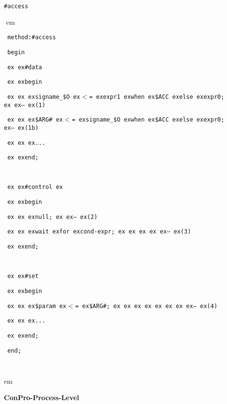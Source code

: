 \documentclass[a4paper,12pt,twoside,english]{article}
\def\s{\hskip 1.15 ex}
\begin{document}
\vskip5pt



\def\thesubsubsection{\vrule width 0pt height 1.3 ex}

\def\thesubsection{\tocXCVIII}
\secII{\label{toclabelXCVIII}\thesubsection}
\begin{description}
\item[] $ $\\
{\tt \#access}

\item[]
\def\prefskipu{}\def\prefskipo{}\def\prefskipa{}\def\prefskipu{\hskip10pt}\def\prefskipo{\hskip10pt}\def\prefskipa{\hskip20pt}\def\content{
\vskip-5pt{\parindent0pt\parbox{\linewidth}{\tt\smallsize\hskip10pt method:\#access}}
\vskip-5pt{\parindent0pt\parbox{\linewidth}{\tt\smallsize\hskip10pt begin}}
\vskip-5pt{\parindent0pt\parbox{\linewidth}{\tt\smallsize\hskip10pt \s \s \#data}}
\vskip-5pt{\parindent0pt\parbox{\linewidth}{\tt\smallsize\hskip10pt \s \s begin}}
\vskip-5pt{\parindent0pt\parbox{\linewidth}{\tt\smallsize\hskip10pt \s \s \s signame\_\$O\s $<$=\s expr1\s when\s \$ACC\s else\s expr0;\s \s --\s (1)}}
\vskip-5pt{\parindent0pt\parbox{\linewidth}{\tt\smallsize\hskip10pt \s \s \s \$ARG\#\s $<$=\s signame\_\$O\s when\s \$ACC\s else\s expr0;\s --\s (1b)}}
\vskip-5pt{\parindent0pt\parbox{\linewidth}{\tt\smallsize\hskip10pt \s \s \s ...}}
\vskip-5pt{\parindent0pt\parbox{\linewidth}{\tt\smallsize\hskip10pt \s \s end;}}
\vskip-5pt{\parindent0pt\parbox{\linewidth}{\tt\smallsize\hskip10pt }}
\vskip-5pt{\parindent0pt\parbox{\linewidth}{\tt\smallsize\hskip10pt \s \s \#control\s }}
\vskip-5pt{\parindent0pt\parbox{\linewidth}{\tt\smallsize\hskip10pt \s \s begin}}
\vskip-5pt{\parindent0pt\parbox{\linewidth}{\tt\smallsize\hskip10pt \s \s \s null;\s \s --\s (2)}}
\vskip-5pt{\parindent0pt\parbox{\linewidth}{\tt\smallsize\hskip10pt \s \s \s wait\s for\s cond-expr;\s \s \s \s \s --\s (3)}}
\vskip-5pt{\parindent0pt\parbox{\linewidth}{\tt\smallsize\hskip10pt \s \s end;}}
\vskip-5pt{\parindent0pt\parbox{\linewidth}{\tt\smallsize\hskip10pt }}
\vskip-5pt{\parindent0pt\parbox{\linewidth}{\tt\smallsize\hskip10pt \s \s \#set}}
\vskip-5pt{\parindent0pt\parbox{\linewidth}{\tt\smallsize\hskip10pt \s \s begin}}
\vskip-5pt{\parindent0pt\parbox{\linewidth}{\tt\smallsize\hskip10pt \s \s \s \$param\s $<$=\s \$ARG\#;\s \s \s \s \s \s \s \s --\s (4)}}
\vskip-5pt{\parindent0pt\parbox{\linewidth}{\tt\smallsize\hskip10pt \s \s \s ...}}
\vskip-5pt{\parindent0pt\parbox{\linewidth}{\tt\smallsize\hskip10pt \s \s end;}}
\vskip-5pt{\parindent0pt\parbox{\linewidth}{\tt\smallsize\hskip10pt end;}}
\vskip-5pt{\parindent0pt\parbox{\linewidth}{\tt\smallsize\hskip10pt }}
}
$ $
 em
\content
{} em
\item[] $ $\\
{\bfseries ConPro-Process-Level}


\end{description}
\end{document}
